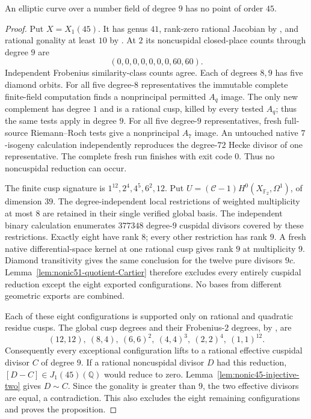
\begin{proposition}\label{prop:nonic-no45}
An elliptic curve over a number field of degree $9$ has no point of order $45$.
\end{proposition}
\begin{proof}
Put $X=X_1(45)$. It has genus $41$, rank-zero rational Jacobian
by \cite[Theorem~3.1(2)]{DEHMZ}, and rational gonality at least $10$
by \cite[Table~1]{NV}. At $2$ its noncuspidal closed-place counts
through degree $9$ are
\[
 (0,0,0,0,0,0,0,60,60).
\]
Independent Frobenius similarity-class counts agree.
Each of degrees $8,9$ has five diamond orbits.
For all five degree-$8$ representatives the immutable complete
finite-field computation finds a nonprincipal permitted $A_q$ image.
The only new complement has degree $1$ and is a rational cusp, killed
by every tested $A_q$; thus the same tests apply in degree $9$.
For all five degree-$9$ representatives, fresh full-source
Riemann--Roch tests give a nonprincipal $A_7$ image.
An untouched native $7$-isogeny calculation independently reproduces
the degree-$72$ Hecke divisor of one representative.
The complete fresh run finishes with exit code $0$.
Thus no noncuspidal reduction can occur.

The finite cusp signature is $1^{12},2^4,4^5,6^2,12$.
Put $U=(\mathcal C-1)H^0(X_{\mathbb F_2},\Omega^1)$, of dimension $39$.
The degree-independent local restrictions of weighted multiplicity
at most $8$ are retained in their single verified global basis.
The independent binary calculation enumerates $377348$ degree-$9$
cuspidal divisors covered by these restrictions. Exactly eight have
rank $8$; every other restriction has rank $9$.
A fresh native differential-space kernel at one rational cusp gives
rank $9$ at multiplicity $9$. Diamond transitivity gives the same
conclusion for the twelve pure divisors $9c$.
Lemma~\ref{lem:nonic51-quotient-Cartier} therefore excludes every
entirely cuspidal reduction except the eight exported configurations.
No bases from different geometric exports are combined.

Each of these eight configurations is supported only on rational
and quadratic residue cusps. The global cusp degrees and their
Frobenius-$2$ degrees, by \cite[Lemma~2.7]{DEHMZ}, are
\[
 (12,12),\ (8,4),\ (6,6)^2,\ (4,4)^3,
 \ (2,2)^4,\ (1,1)^{12}.
\]
Consequently every exceptional configuration lifts to a rational
effective cuspidal divisor $C$ of degree $9$.
If a rational noncuspidal divisor $D$ had this reduction,
$[D-C]\in J_1(45)(\mathbb Q)$ would reduce to zero.
Lemma~\ref{lem:nonic45-injective-two} gives $D\sim C$.
Since the gonality is greater than $9$, the two effective divisors
are equal, a contradiction.
This also excludes the eight remaining configurations and proves
the proposition.
\end{proof}
